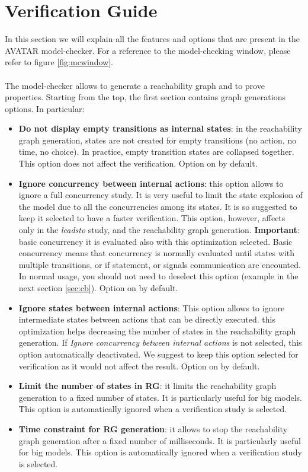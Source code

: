 \documentclass[12pt]{article}
\begin{document}
\section{Verification Guide} \label{sec:vg}
In this section we will explain all the features and options that are present in the AVATAR model-checker. For a reference to the model-checking window, please refer to figure \ref{fig:mcwindow}.
\\\\The model-checker allows to generate a reachability graph and to prove properties. Starting from the top, the first section contains graph generations options. In particular:
\begin{itemize}
	\item \textbf{Do not display empty transitions as internal states}: in the reachability graph generation, states are not created for empty transitions (no action, no time, no choice). In practice, empty transition states are collapsed together. This option does not affect the verification. Option on by default.
	\item \textbf{Ignore concurrency between internal actions}: this option allows to ignore a full concurrency study. It is very useful to limit the state explosion of the model due to all the concurrencies among its states. It is so suggested to keep it selected to have a faster verification. This option, however, affects only in the \textit{leadsto} study, and the reachability graph generation. \textbf{Important}: basic concurrency it is evaluated also with this optimization selected. Basic concurrency means that concurrency is normally evaluated until states with multiple transitions, or if statement, or signals communication are encounted. In normal usage, you should not need to deselect this option (example in the next section \ref{sec:cb}). Option on by default.
	\item \textbf{Ignore states between internal actions}: This option allows to ignore intermediate states between actions that can be directly executed. this optimization helps decreasing the number of states in the reachability graph generation. If  \textit{Ignore concurrency between internal actions} is not selected, this option automatically deactivated. We suggest to keep this option selected for verification as it would not affect the result. Option on by default.
	 \item \textbf{Limit the number of states in RG}: it limits the reachability graph generation to a fixed number of states. It is particularly useful for big models. This option is automatically ignored when a verification study is selected.
	 \item \textbf{Time constraint for RG generation}: it allows to stop the reachability graph generation after a fixed number of milliseconds. It is particularly useful for big models. This option is automatically ignored when a verification study is selected.
\end{itemize}
\end{document}
